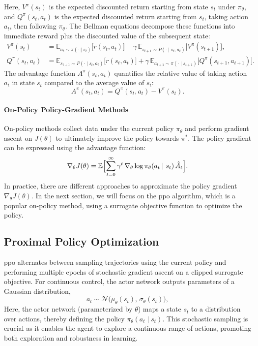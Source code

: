 Here, \(V^\pi(s_t)\) is the expected discounted return starting from state \(s_t\) under \(\pi_\theta\), and \(Q^\pi(s_t,a_t)\) is the expected discounted return starting from \(s_t\), taking action \(a_t\), then following \(\pi_\theta\).
The Bellman equations decompose these functions into immediate reward plus the discounted value of the subsequent state:
\begin{align}
V^\pi(s_t)
&= \mathbb{E}_{a_t\sim\pi(\cdot\mid s_t)}\bigl[r(s_t,a_t)\bigr]
  + \gamma\,\mathbb{E}_{s_{t+1}\sim P(\cdot\mid s_t,a_t)}\bigl[V^\pi(s_{t+1})\bigr],\\
Q^\pi(s_t,a_t)
&= \mathbb{E}_{s_{t+1}\sim P(\cdot\mid s_t,a_t)}\bigl[r(s_t,a_t)\bigr]
  + \gamma\,\mathbb{E}_{a_{t+1}\sim\pi(\cdot\mid s_{t+1})}\bigl[Q^\pi(s_{t+1},a_{t+1})\bigr].
\end{align}
The advantage function \(A^\pi(s_t,a_t)\) quantifies the relative value of taking action \(a_t\) in state \(s_t\) compared to the average value of \(s_t\):
\begin{equation}
A^\pi(s_t,a_t) = Q^\pi(s_t,a_t) - V^\pi(s_t).
\end{equation}

\paragraph{On-Policy Policy-Gradient Methods}
On-policy methods collect data under the current policy \(\pi_\theta\) and perform gradient ascent on \(J(\theta)\) to ultimately improve the policy towards \(\pi^*\). The policy gradient can be expressed using the advantage function:
\begin{equation}
\nabla_\theta J(\theta)
= \mathbb{E}\Bigl[\sum_{t=0}^\infty \gamma^t \,\nabla_\theta \log \pi_\theta(a_t\mid s_t)\,\hat A_t\Bigr].
\end{equation}
In practice, there are different approaches to approximate the policy gradient \(\nabla_{\theta}J(\theta)\). In the next section, we will focus on the \gls{ppo} algorithm, which is a popular on-policy method, using a surrogate objective function to optimize the policy.
\subsection{Proximal Policy Optimization}
\gls{ppo} \cite{schulman2017proximal} alternates between sampling trajectories using the current policy and performing multiple epochs of stochastic gradient ascent on a clipped surrogate objective. For continuous control, the actor network outputs parameters of a Gaussian distribution,
\begin{equation}
a_t \sim \mathcal{N}\bigl(\mu_\theta(s_t),\,\sigma_\theta(s_t)\bigr),
\end{equation}
Here, the actor network (parameterized by \(\theta\)) maps a state \(s_t\) to a distribution over actions, thereby defining the policy \(\pi_\theta(a_t \mid s_t)\). This stochastic sampling is crucial as it enables the agent to explore a continuous range of actions, promoting both exploration and robustness in learning.

